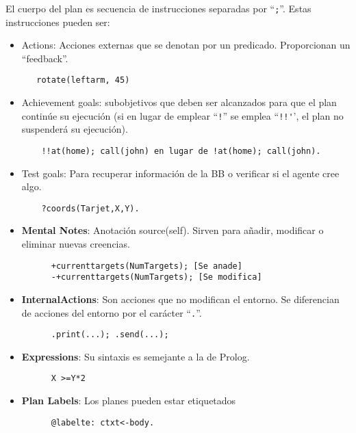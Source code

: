 El cuerpo del plan es secuencia de instrucciones separadas por ``\lstinline|;|''. Estas instrucciones pueden ser:\ns
\begin{itemize}
	\item Actions: Acciones externas que se denotan por un predicado.
	      Proporcionan un ``feedback''.
	      \begin{lstlisting}
   rotate(leftarm, 45)
         \end{lstlisting}
	\item Achievement goals: subobjetivos que deben ser alcanzados para que el
	      plan continúe su ejecución (si en lugar de emplear ``\lstinline|!|'' se emplea ``\lstinline|!!'|', el
	      plan no suspenderá su ejecución).
	      \begin{lstlisting}
	!!at(home); call(john) en lugar de !at(home); call(john).
         \end{lstlisting}
	\item Test goals: Para recuperar información de la BB o verificar si el agente
	      cree algo.
	      \begin{lstlisting}
	?coords(Tarjet,X,Y).
         \end{lstlisting}
   \item \textbf{Mental Notes}: Anotación source(self). Sirven para añadir, modificar o eliminar nuevas
   creencias.
   \begin{lstlisting}
      +currenttargets(NumTargets); [Se anade]
      -+currenttargets(NumTargets); [Se modifica]
   \end{lstlisting}
   \item \textbf{InternalActions}: Son acciones que no modifican el entorno. Se diferencian de acciones del
   entorno por el carácter ``\lstinline|.|''.
   \begin{lstlisting}
      .print(...); .send(...);
   \end{lstlisting}
   \item \textbf{Expressions}: Su sintaxis es semejante a la de Prolog.
   \begin{lstlisting}
      X >=Y*2
   \end{lstlisting}
   \item \textbf{Plan Labels}: Los planes pueden estar etiquetados
   \begin{lstlisting}
      @labelte: ctxt<-body.
   \end{lstlisting}
\end{itemize}

